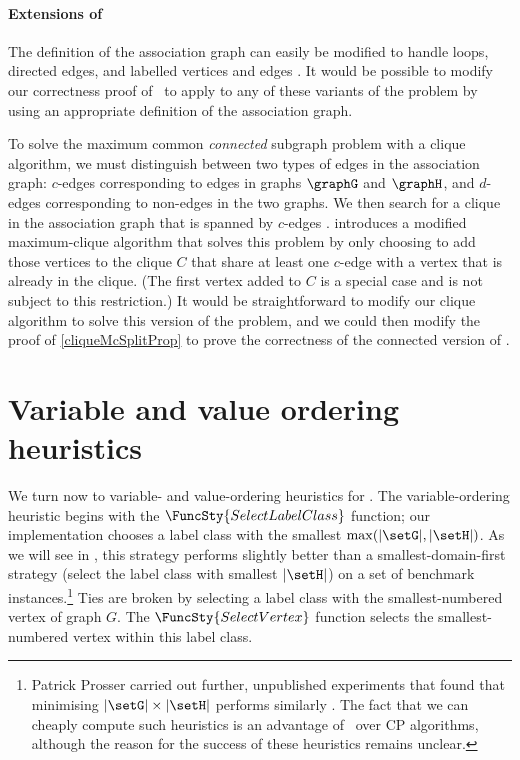 \paragraph{Extensions of \McSplit}
The definition of the association graph can easily be modified to handle loops,
directed edges, and labelled vertices and edges \citep{LeviG}.  It would be
possible to modify our correctness proof of \McSplit\ to apply to any of these
variants of the problem by using an appropriate definition of the association
graph.

To solve the maximum common \emph{connected} subgraph problem with a clique algorithm,
we must distinguish between two types of edges in the association graph: $c$-edges
corresponding to edges in graphs $\graphG$ and $\graphH$, and $d$-edges corresponding
to non-edges in the two graphs.  We then search for a clique in the association graph
that is spanned by $c$-edges
\citep{DBLP:journals/tcs/Koch01,DBLP:conf/mco/VismaraV08,DBLP:conf/cp/McCreeshNPS16}.
\citet{DBLP:conf/cp/McCreeshNPS16} introduces a modified maximum-clique algorithm
that solves this problem by only choosing to add those vertices to the clique $C$ that
share at least one $c$-edge with a vertex that is already in the clique.  (The first
vertex added to $C$ is a special case and is not subject to this restriction.)
It would be straightforward to modify our clique algorithm to solve this version of the
problem, and we could then modify the proof of \cref{cliqueMcSplitProp} to prove the
correctness of the connected version of \McSplit.

\section{Variable and value ordering heuristics}\label{sec:mcsplit-heuristics}

We turn now to variable- and value-ordering heuristics for \McSplit.
The variable-ordering heuristic begins with the $\FuncSty{SelectLabelClass}$
function; our implementation chooses a label class with the smallest
$\max(|\setG|,|\setH|)$. As we will see in 
, this strategy performs slightly
better than a smallest-domain-first strategy (select the label class
with smallest $|\setH|$) on a set of benchmark instances.\footnote{Patrick
Prosser carried out further, unpublished experiments
that found that minimising $|\setG|\times|\setH|$ performs similarly
\citep{Prosser2017McSplitHeuristics}. The fact that we can cheaply compute
such heuristics is an advantage of \McSplit\ over CP algorithms, although
the reason for the success of these heuristics remains unclear.}
Ties are broken by selecting a label class with the smallest-numbered
vertex of graph $G$.
The $\FuncSty{SelectVertex}$ function selects the smallest-numbered vertex
within this label class.

